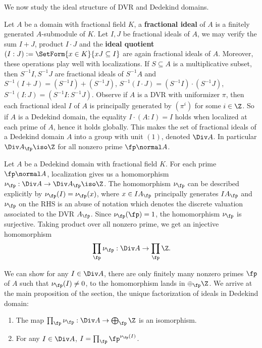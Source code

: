 \documentclass[11pt]{amsart}
\begin{document}
We now study the ideal structure of DVR and Dedekind domains.

Let $A$ be a domain with fractional field $K$, a 
{\bf fractional ideal} of $A$ is a finitely generated $A$-submodule of $K$.
Let $I, J$ be fractional ideals of $A$, we may verify the sum $I + J$, product
$I \cdot J$ and the  {\bf ideal quotient} $(I : J) :=
\SetForm{x \in K}{xJ \subseteq I}$ are again fractional ideals of $A$.
Moreover, these operations play well with localizations.  If $S \subseteq A$ is
a multiplicative subset, then  $S^{-1}I, S^{-1}J$ are fractional ideals of
$S^{-1}A$ and $S^{-1}(I + J) = (S^{-1}I) + (S^{-1}J)$, $S^{-1}(I \cdot J) =
(S^{-1}I) \cdot (S^{-1}J)$, $ S^{-1}(I : J) = (S^{-1}I : S^{-1}J)$.  Observe if
$A$ is a DVR with uniformizer $\pi$, then each fractional ideal $I$ of $A$ is
principally generated by $(\pi^i)$ for some $i \in \Z$.  So if $A$ is a Dedekind
domain, the equality $I \cdot (A : I) = I$ holds when localized at each prime of
$A$, hence it holds globally.  This makes the set of fractional ideals of a
Dedekind domain $A$ into a group with unit $(1)$, denoted  $\Div
A$.  In particular $\Div A_{\fp} \iso \Z$ for all nonzero prime $\fp \normal A$.

Let $A$ be a Dedekind domain with fractional field $K$. For each prime $\fp
\normal A$, localization gives us a homomorphism $\nu_{\fp} : \Div A \to \Div
A_{\fp} \iso \Z$.  The homomorphism $\nu_{\fp}$ can be described explicitly by
$\nu_{\fp}(I) = \nu_{\fp}(x)$, where $x \in IA_{\fp}$ principally generates
$IA_{\fp}$ and $\nu_{\fp}$ on the RHS is an abuse of notation which denotes the
discrete valuation associated to the DVR $A_{\fp}$.  Since $\nu_{\fp}(\fp) = 1$,
the homomorphism $\nu_{\fp}$ is surjective.  Taking product over all nonzero
prime, we get an injective homomorphism
\[
    \prod_{\fp} \nu_{\fp} : \Div A \to \prod_{\fp} \Z.
\]

We can show %
for any $I \in \Div A$, there are only finitely many nonzero primes $\fp$ of $A$
such that $\nu_{\fp}(I) \neq 0$, to the homomorphism lands in $\oplus_{\fp} \Z$.
We arrive at the main proposition of the section, the unique factorization of
ideals in Dedekind domain:

\begin{prop}
    \begin{enumerate}
        \item The map $\prod_{\fp} \nu_{\fp} : \Div A \to \bigoplus_{\fp} \Z$ is
            an isomorphism.
        \item For any $I \in \Div A$, $I = \prod_{\fp} \fp^{\nu_{\fp}(I)}$.
    \end{enumerate}
\end{prop}
\end{document}
